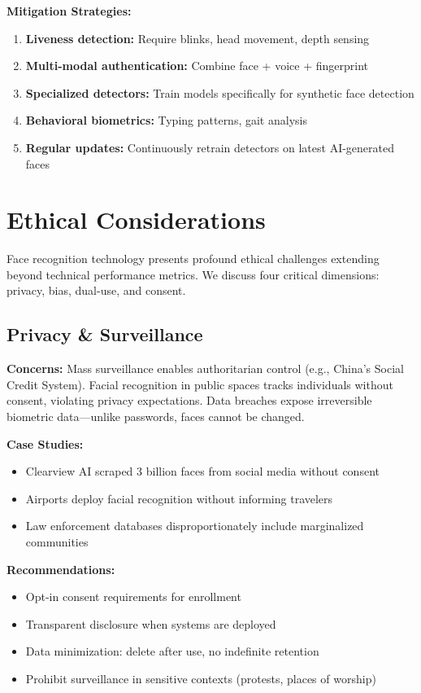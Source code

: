 \documentclass[11pt,a4paper]{article}
\begin{document}
\textbf{Mitigation Strategies:}
\begin{enumerate}
    \item \textbf{Liveness detection:} Require blinks, head movement, depth sensing
    \item \textbf{Multi-modal authentication:} Combine face + voice + fingerprint
    \item \textbf{Specialized detectors:} Train models specifically for synthetic face detection
    \item \textbf{Behavioral biometrics:} Typing patterns, gait analysis
    \item \textbf{Regular updates:} Continuously retrain detectors on latest AI-generated faces
\end{enumerate}

\section{Ethical Considerations}

Face recognition technology presents profound ethical challenges extending beyond technical performance metrics. We discuss four critical dimensions: privacy, bias, dual-use, and consent.

\subsection{Privacy \& Surveillance}

\textbf{Concerns:} Mass surveillance enables authoritarian control (e.g., China's Social Credit System). Facial recognition in public spaces tracks individuals without consent, violating privacy expectations. Data breaches expose irreversible biometric data—unlike passwords, faces cannot be changed.

\textbf{Case Studies:}
\begin{itemize}
    \item Clearview AI scraped 3 billion faces from social media without consent
    \item Airports deploy facial recognition without informing travelers
    \item Law enforcement databases disproportionately include marginalized communities
\end{itemize}

\textbf{Recommendations:}
\begin{itemize}
    \item Opt-in consent requirements for enrollment
    \item Transparent disclosure when systems are deployed
    \item Data minimization: delete after use, no indefinite retention
    \item Prohibit surveillance in sensitive contexts (protests, places of worship)
\end{itemize}
\end{document}
